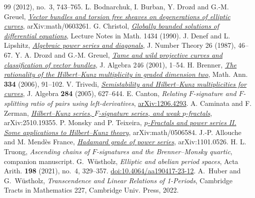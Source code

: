 \documentclass[11pt,a4paper,reqno]{amsart}
\numberwithin{equation}{section}
\theoremstyle{plain}
\begin{document}
\begin{thebibliography}{99}
(2012), no.~3, 743--765.
L. Bodnarchuk, I. Burban, Y. Drozd and G.-M. Greuel,
\href{https://arxiv.org/abs/math/0603261}{\emph{Vector bundles and torsion free sheaves on degenerations of elliptic curves}}, arXiv:math/0603261.
G. Christol, \href{https://doi.org/10.1007/BFb0097124}{\emph{Globally bounded solutions of differential equations}}, Lecture Notes in Math. 1434 (1990).
J. Denef and L. Lipshitz, \href{https://doi.org/10.1016/0022-314X(87)90095-3}{\emph{Algebraic power series and diagonals}}, J. Number Theory 26 (1987), 46--67.
Y. A. Drozd and G.-M. Greuel, \href{https://doi.org/10.1006/jabr.2001.8934}{\emph{Tame and wild projective curves and classification of vector bundles}}, J. Algebra 246 (2001), 1--54.
H. Brenner, \href{https://doi.org/10.1007/s00208-005-0703-x}{\emph{The rationality of the Hilbert--Kunz multiplicity in graded dimension two}}, Math. Ann. \textbf{334} (2006), 91--102.
V. Trivedi, \href{https://doi.org/10.1016/j.jalgebra.2004.10.016}{\emph{Semistability and Hilbert--Kunz multiplicities for curves}}, J. Algebra \textbf{284} (2005), 627--644.
E. Canton, \emph{Relating $F$-signature and $F$-splitting ratio of pairs using left-derivatives}, \href{https://arxiv.org/abs/1206.4293}{arXiv:1206.4293}.
A. Caminata and F. Zerman, \href{https://arxiv.org/abs/2510.19355}{\emph{Hilbert--Kunz series, $F$-signature series, and weak $p$-fractals}}, arXiv:2510.19355.
P. Monsky and P. Teixeira, \href{https://arxiv.org/abs/math/0506584}{\emph{$p$-Fractals and power series II. Some applications to Hilbert--Kunz theory}}, arXiv:math/0506584.
J.-P. Allouche and M. Mend\`es France, \href{https://arxiv.org/abs/1101.0526}{\emph{Hadamard grade of power series}}, arXiv:1101.0526.
H. L. Truong, \emph{Ascending chains of $F$-signatures and the Brenner--Monsky quartic}, companion manuscript.
G.~W\"ustholz, \emph{Elliptic and abelian period spaces}, Acta Arith. \textbf{198} (2021), no.~4, 329--357. \href{https://doi.org/10.4064/aa190417-23-12}{doi:10.4064/aa190417-23-12}.
A.~Huber and G.~W\"ustholz, \emph{Transcendence and Linear Relations of 1-Periods}, Cambridge Tracts in Mathematics 227, Cambridge Univ. Press, 2022.
\end{thebibliography}
\end{document}
